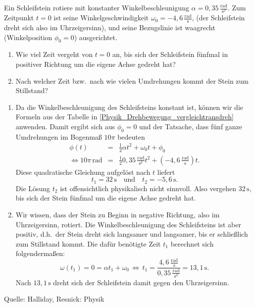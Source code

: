     \begin{MExercises}
    
    \begin{MExercise}
    Ein Schleifstein rotiere mit konstanter Winkelbeschleunigung $\alpha=0{,}35\,\frac{\text{rad}}{\text{s}^2}$. Zum Zeitpunkt $t=0$ ist seine Winkelgeschwindigkeit $\omega_0=-4{,}6\,\frac{\text{rad}}{\text{s}}$, (der Schleifstein dreht sich also im Uhrzeigersinn), und seine Bezugslinie ist waagrecht (Winkelposition $\phi_0=0$) ausgerichtet. 
    \begin{enumerate}
    \item Wie viel Zeit vergeht von $t=0$ an, bis sich der Schleifstein f\"unfmal in positiver Richtung um die eigene Achse gedreht hat?
    \item Nach welcher Zeit bzw.~nach wie vielen Umdrehungen kommt der Stein zum Stillstand?
    \end{enumerate}
    \begin{MSolution}
    \begin{enumerate}
    \item Da die Winkelbeschleunigung des Schleifsteins konstant ist, k\"onnen wir die Formeln aus der Tabelle in \ref{Physik_Drehbewegung_vergleichtransdreh} anwenden. Damit ergibt sich aus $\phi_0=0$ und der Tatsache, dass f\"unf ganze Umdrehungen im Bogenma{\ss} $10\pi$ bedeuten
    \begin{eqnarray}
    \phi(t)&=&\frac{1}{2}\alpha t^2+\omega_0t+\phi_0\\
    \Leftrightarrow 10\pi\,\text{rad}&=&\frac{1}{2}0{,}35\,\frac{\text{rad}}{\text{s}^2}t^2+(-4{,}6\,\frac{\text{rad}}{\text{s}})t.
    \end{eqnarray} Diese quadratische Gleichung aufgel\"ost nach $t$ liefert
    $$
    t_1=32\,\text{s}\quad\text{und}\quad t_2=-5{,}6\,\text{s.}
    $$ Die L\"osung $t_2$ ist offensichtlich physikalisch nicht sinnvoll. Also vergehen $32\,\text{s}$, bis sich der Stein f\"unfmal um die eigene Achse gedreht hat.
    \item Wir wissen, dass der Stein zu Beginn in negative Richtung, also im Uhrzeigersinn, rotiert. Die Winkelbeschleunigung des Schleifsteins ist aber positiv, d.h.~der Stein dreht sich langsamer und langsamer, bis er schlie{\ss}lich zum Stillstand kommt. Die daf\"ur ben\"otigte Zeit $t_1$ berechnet sich folgenderma{\ss}en:
    $$
    \omega(t_1)=0=\alpha t_1+\omega_0\,\Leftrightarrow\, t_1=\frac{4{,}6\,\frac{\text{rad}}{\text{s}}}{0{,}35\,\frac{\text{rad}}{\text{s}^2}}=13{,}1\,\text{s}.
    $$Nach $13{,}1\,\text{s}$ dreht sich der Schleifstein damit gegen den Uhrzeigersinn. 
    \end{enumerate}
    Quelle: Halliday, Resnick: Physik
    \end{MSolution}
    \end{MExercise}
    
    \end{MExercises}
    
